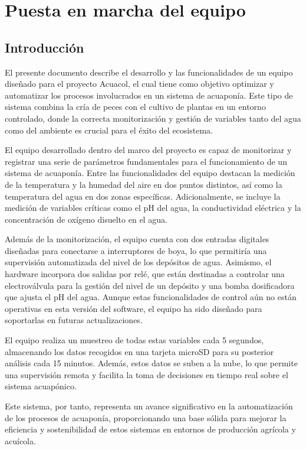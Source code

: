 \chapter{Puesta en marcha del equipo}

\section{Introducción}

El presente documento describe el desarrollo y las funcionalidades de un equipo diseñado para el proyecto Acuacol, el cual tiene como objetivo optimizar y automatizar los procesos involucrados en un sistema de acuaponía. Este tipo de sistema combina la cría de peces con el cultivo de plantas en un entorno controlado, donde la correcta monitorización y gestión de variables tanto del agua como del ambiente es crucial para el éxito del ecosistema.

El equipo desarrollado dentro del marco del proyecto es capaz de monitorizar y registrar una serie de parámetros fundamentales para el funcionamiento de un sistema de acuaponía. Entre las funcionalidades del equipo destacan la medición de la temperatura y la humedad del aire en dos puntos distintos, así como la temperatura del agua en dos zonas específicas. Adicionalmente, se incluye la medición de variables críticas como el pH del agua, la conductividad eléctrica y la concentración de oxígeno disuelto en el agua.

Además de la monitorización, el equipo cuenta con dos entradas digitales diseñadas para conectarse a interruptores de boya, lo que permitiría una supervisión automatizada del nivel de los depósitos de agua. Asimismo, el hardware incorpora dos salidas por relé, que están destinadas a controlar una electroválvula para la gestión del nivel de un depósito y una bomba dosificadora que ajusta el pH del agua. Aunque estas funcionalidades de control aún no están operativas en esta versión del software, el equipo ha sido diseñado para soportarlas en futuras actualizaciones.

El equipo realiza un muestreo de todas estas variables cada 5 segundos, almacenando los datos recogidos en una tarjeta microSD para su posterior análisis cada 15 minutos. Además, estos datos se suben a la nube, lo que permite una supervisión remota y facilita la toma de decisiones en tiempo real sobre el sistema acuapónico.

Este sistema, por tanto, representa un avance significativo en la automatización de los procesos de acuaponía, proporcionando una base sólida para mejorar la eficiencia y sostenibilidad de estos sistemas en entornos de producción agrícola y acuícola.

